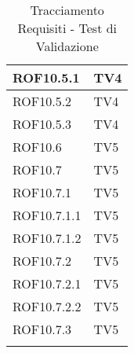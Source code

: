 \begin{center}
\begin{longtable}{|p{7cm}|p{7cm}|}
\midrule
ROF10.5.1 & TV4\\
\midrule
ROF10.5.2 & TV4\\
\midrule
ROF10.5.3 & TV4\\
\midrule
ROF10.6 & TV5\\
\midrule
ROF10.7 & TV5\\
\midrule
ROF10.7.1 & TV5\\
\midrule
ROF10.7.1.1 & TV5\\
\midrule
ROF10.7.1.2 & TV5\\
\midrule
ROF10.7.2 & TV5\\
\midrule
ROF10.7.2.1 & TV5\\
\midrule
ROF10.7.2.2 & TV5\\
\midrule
ROF10.7.3 & TV5\\

\bottomrule
\caption{Tracciamento Requisiti - Test di Validazione}
\label{tab:changelog}
\end{longtable}
\end{center}
